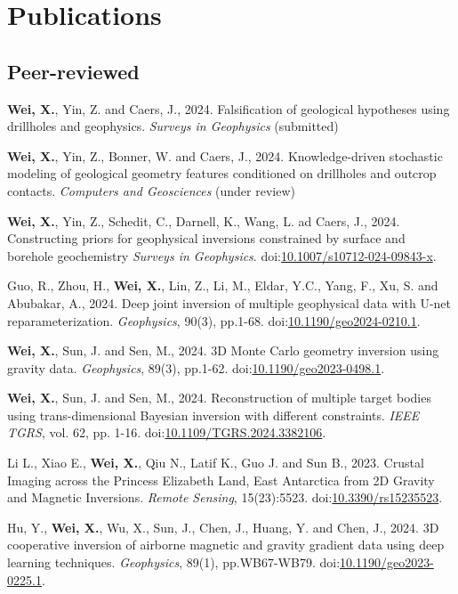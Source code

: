 \documentclass[11pt, a4paper]{article}
\newcommand{\LastName}{Wei}
\newcommand{\Initials}{X}
\newcommand{\Wei}{\textbf{\LastName, \Initials.}}  %
\newcommand{\Review}{under review}
\newcommand{\DOI}[1]{doi:\href{https://doi.org/#1}{#1}}
\begin{document}
\section*{Publications}
\subsection*{Peer-reviewed}
\begin{etaremune}	
	\item
	\Wei, Yin, Z. and Caers, J., 2024. Falsification of geological hypotheses using drillholes and geophysics. \emph{Surveys in Geophysics} (submitted)	
	
	\item
	\Wei, Yin, Z., Bonner, W. and Caers, J., 2024. Knowledge-driven stochastic modeling of geological geometry features conditioned on drillholes and outcrop contacts. \emph{Computers and Geosciences} (\Review)
	
	\item 
	\Wei, Yin, Z., Schedit, C., Darnell, K., Wang, L. ad Caers, J., 2024. Constructing priors for geophysical inversions constrained by surface and borehole geochemistry \emph{Surveys in Geophysics}. \DOI{10.1007/s10712-024-09843-x}.
	
	\item
	Guo, R., Zhou, H., \Wei, Lin, Z., Li, M., Eldar, Y.C., Yang, F., Xu, S. and Abubakar, A., 2024. Deep joint inversion of multiple geophysical data with U-net reparameterization. \emph{Geophysics}, 90(3), pp.1-68. \DOI{10.1190/geo2024-0210.1}. 
	
	\item
	\Wei, Sun, J. and Sen, M., 2024. 3D Monte Carlo geometry inversion using gravity data. \emph{Geophysics}, 89(3), pp.1-62. \DOI{10.1190/geo2023-0498.1}.
	
	\item
	\Wei, Sun, J. and Sen, M., 2024. Reconstruction of multiple target bodies using trans-dimensional Bayesian inversion with different constraints. \emph{IEEE TGRS}, vol. 62, pp. 1-16. \DOI{10.1109/TGRS.2024.3382106}. 
	
	\item
	Li L., Xiao E., \Wei, Qiu N., Latif K., Guo J. and Sun B., 2023. Crustal Imaging across the Princess Elizabeth Land, East Antarctica from 2D Gravity and Magnetic Inversions. \emph{Remote Sensing}, 15(23):5523. \DOI{10.3390/rs15235523}.
	
	\item
	Hu, Y., \Wei, Wu, X., Sun, J., Chen, J., Huang, Y. and Chen, J., 2024. 3D cooperative inversion of airborne magnetic and gravity gradient data using deep learning techniques. \emph{Geophysics}, 89(1), pp.WB67-WB79. \DOI{10.1190/geo2023-0225.1}.
	

\end{etaremune}
\end{document}

